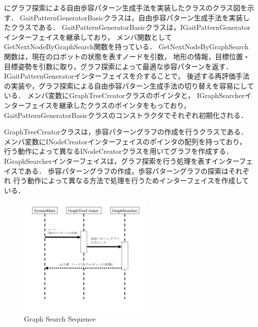 にグラフ探索による自由歩容パターン生成手法を実装したクラスのクラス図を示す．
GaitPatternGeneratorBasicクラスは，自由歩容パターン生成手法を実装したクラスである．
GaitPatternGeneratorBasicクラスは，IGaitPatternGeneratorインターフェイスを継承しており，
メンバ関数としてGetNextNodeByGraphSearch関数を持っている．
GetNextNodeByGraphSearch関数は，現在のロボットの状態を表すノードを引数，
地形の情報，目標位置・目標姿勢を引数に取り，グラフ探索によって最適な歩容パターンを返す．
IGaitPatternGeneratorインターフェイスを介することで，
後述する再評価手法の実装や，グラフ探索による自由歩容パターン生成手法の切り替えを容易にしている．
メンバ変数にGraphTreeCreatorクラスのポインタと，
IGraphSearcherインターフェイスを継承したクラスのポインタをもっており，
GaitPatternGeneratorBasicクラスのコンストラクタでそれぞれ初期化される．

GraphTreeCreatorクラスは，歩容パターングラフの作成を行うクラスである．
メンバ変数にINodeCreatorインターフェイスのポインタの配列を持っており，
行う動作によって異なるINodeCreatorクラスを用いてグラフを作成する．
IGraphSearcherインターフェイスは，グラフ探索を行う処理を表すインターフェイスである．
歩容パターングラフの作成，歩容パターングラフの探索はそれぞれ
行う動作によって異なる方法で処理を行うためインターフェイスを作成している．

\begin{figure}[htbp]
  \begin{center}
    \includegraphics[width=65mm, clip]{figure/chapter3/sequence_main.png}
    \caption{Graph Search Sequence}
    \label{fig:graph_search_sequence} %
  \end{center}
\end{figure}

